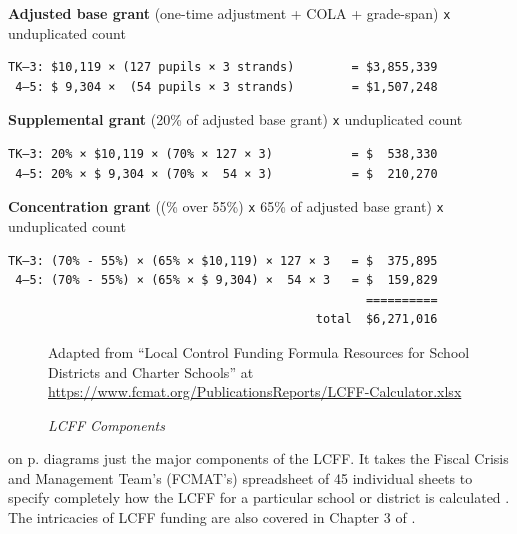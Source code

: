\noindent\textbf{Adjusted base grant} \hfill{}(one-time adjustment + COLA + grade-span) \texttt{x} unduplicated count
\OnehalfSpacing%
\begin{verbatim}
TK–3: $10,119 × (127 pupils × 3 strands)        = $3,855,339
 4–5: $ 9,304 ×  (54 pupils × 3 strands)        = $1,507,248
\end{verbatim}
\noindent\textbf{Supplemental grant} \hfill(20\% of adjusted base grant) \texttt{x} unduplicated count
\OnehalfSpacing%
\begin{verbatim}
TK–3: 20% × $10,119 × (70% × 127 × 3)           = $  538,330
 4–5: 20% × $ 9,304 × (70% ×  54 × 3)           = $  210,270
\end{verbatim}
\noindent\textbf{Concentration grant} \hfill{}((\% over 55\%) \texttt{x} 65\% of adjusted base grant) \texttt{x} unduplicated count
\OnehalfSpacing%
\begin{verbatim}
TK–3: (70% - 55%) × (65% × $10,119) × 127 × 3   = $  375,895
 4–5: (70% - 55%) × (65% × $ 9,304) ×  54 × 3   = $  159,829
                                                  ==========
                                           total  $6,271,016
\end{verbatim}
\DoubleSpacing

\begin{figure}[htbp]
  \caption[LCFF Components]{\textit{LCFF Components}}\label{fig:lcff_components}%
  {Adapted from ``Local Control Funding Formula Resources for School Districts and Charter Schools'' at \url{https://www.fcmat.org/PublicationsReports/LCFF-Calculator.xlsx}}
\end{figure}

 on p.\pageref{fig:lcff_components} diagrams just the major components of the LCFF. It takes the Fiscal Crisis and Management Team's (FCMAT's) spreadsheet of 45 individual sheets to specify completely how the LCFF for a particular school or district is calculated \parencite{FCMAT2024}. The intricacies of LCFF funding are also covered in Chapter 3 of \textcite[35–58]{Aguinaldo.etal2022}.

